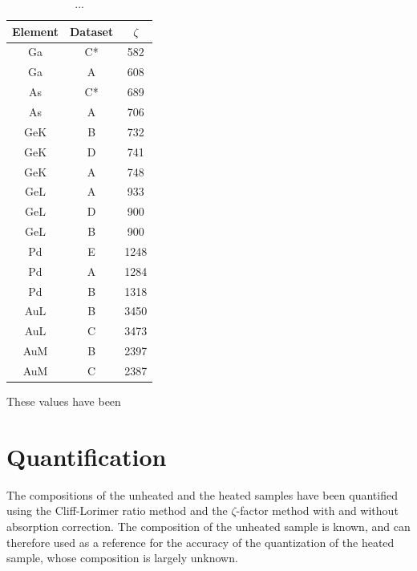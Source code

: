 \begin{table}
	\caption{...}
	\begin{center}
	\begin{tabular}{ccc}

	Element & Dataset & $\zeta$\\ 
	\midrule
	\hline
	Ga & C* & 582\\
	Ga & A  & 608\\
	As & C* & 689\\
	As & A  & 706\\
	GeK & B  & 732\\
	GeK & D  & 741\\
	GeK & A  & 748\\
	GeL & A & 933\\
	GeL & D & 900\\
	GeL & B & 900\\
	Pd & E  & 1248\\
	Pd & A  & 1284\\
	Pd & B  & 1318\\
	AuL & B  & 3450\\ 
	AuL & C  & 3473\\
	AuM & B & 2397\\
	AuM & C & 2387\\
	\hline
	\end{tabular} 
	\end{center}
	\label{tab:non-heated zeta-values}
\end{table}

These values have been 


\section{Quantification}

The compositions of the unheated and the heated samples have been quantified using the Cliff-Lorimer ratio method and the $\zeta$-factor method with and without absorption correction. The composition of the unheated sample is known, and can therefore used as a reference for the accuracy of the quantization of the heated sample, whose composition is largely unknown.

